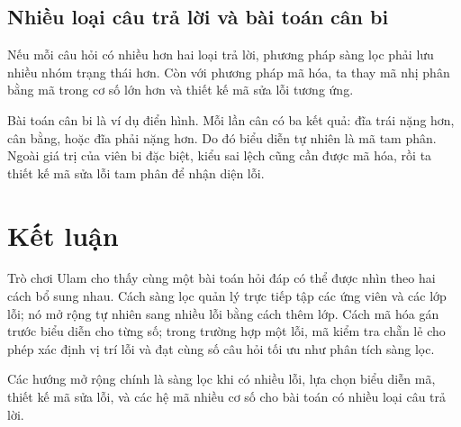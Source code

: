 \documentclass[11pt]{article}
\begin{document}
\begin{center}
\end{center}

\subsection{Nhiều loại câu trả lời và bài toán cân bi}

Nếu mỗi câu hỏi có nhiều hơn hai loại trả lời, phương pháp sàng lọc phải lưu
nhiều nhóm trạng thái hơn. Còn với phương pháp mã hóa, ta thay mã nhị phân
bằng mã trong cơ số lớn hơn và thiết kế mã sửa lỗi tương ứng.

Bài toán cân bi là ví dụ điển hình. Mỗi lần cân có ba kết quả: đĩa trái
nặng hơn, cân bằng, hoặc đĩa phải nặng hơn. Do đó biểu diễn tự nhiên là mã
tam phân. Ngoài giá trị của viên bi đặc biệt, kiểu sai lệch cũng cần được mã
hóa, rồi ta thiết kế mã sửa lỗi tam phân để nhận diện lỗi.

\section{Kết luận}

Trò chơi Ulam cho thấy cùng một bài toán hỏi đáp có thể được nhìn theo hai
cách bổ sung nhau. Cách sàng lọc quản lý trực tiếp tập các ứng viên và các
lớp lỗi; nó mở rộng tự nhiên sang nhiều lỗi bằng cách thêm lớp. Cách mã hóa
gán trước biểu diễn cho từng số; trong trường hợp một lỗi, mã kiểm tra chẵn
lẻ cho phép xác định vị trí lỗi và đạt cùng số câu hỏi tối ưu như phân tích
sàng lọc.

Các hướng mở rộng chính là sàng lọc khi có nhiều lỗi, lựa chọn biểu diễn mã,
thiết kế mã sửa lỗi, và các hệ mã nhiều cơ số cho bài toán có nhiều loại câu
trả lời.
\end{document}
